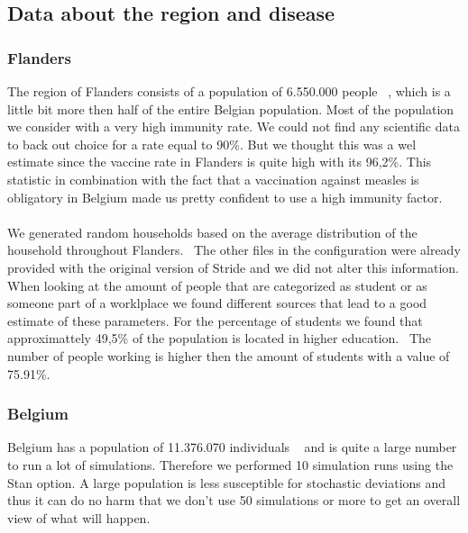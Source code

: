 \documentclass[runningheads]{llncs}
\begin{document}
	\subsection{Data about the region and disease}
	
	\subsubsection{Flanders} 
	The region of Flanders consists of a population of 6.550.000 people ~\cite{url_vlaanderen_pop}, which is a little bit more then half of the entire Belgian population. Most of the population we consider with a very high immunity rate. We could not find any scientific data to back out choice for a rate equal to 90\%. But we thought this was a wel estimate since the vaccine rate in Flanders is quite high with its 96,2\%. This statistic in combination with the fact that a vaccination against measles is obligatory in Belgium made us pretty confident to use a high immunity factor. ~\cite{ref_url_vaccine_europe} ~\cite{ref_url_mazelen} ~\cite{ref_url_vaccinerate}\\
	
	We generated random households based on the average distribution of the household throughout Flanders.~\cite{diagram_hh_FL} The other files in the configuration were already provided with the original version of Stride and we did not alter this information. When looking at the amount of people that are categorized as student or as someone part of a worklplace we found different sources that lead to a good estimate of these parameters. For the percentage of students we found that approximattely 49,5\% of the population is located in higher education.~\cite{src_Vlaams_onderwijs} The number of people working is higher then the amount of students with a value of 75.91\%.~\cite{ref_url_working_fl}
	
	\subsubsection{Belgium}
	
	Belgium has a population of 11.376.070 individuals ~\cite{url_pop_be} and is quite a large number to run a lot of simulations. Therefore we performed 10 simulation runs using the Stan option. A large population is less susceptible for stochastic deviations and thus it can do no harm that we don't use 50 simulations or more to get an overall view of what will happen.\\
	
\end{document}
